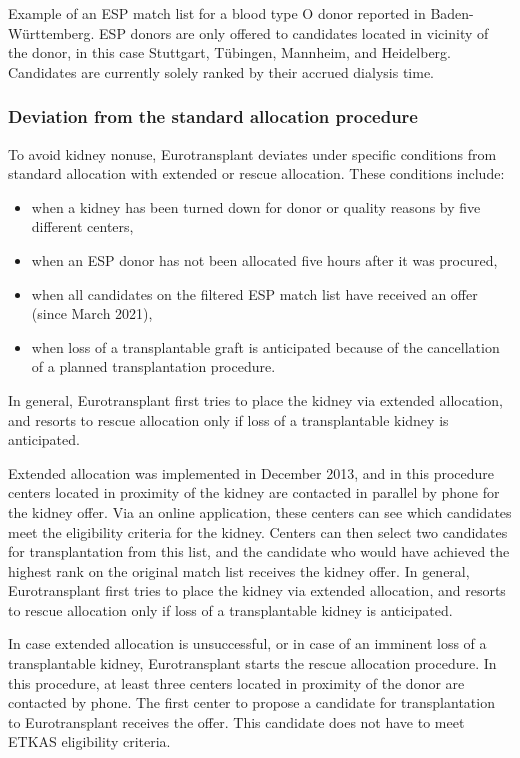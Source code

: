 \begin{table}[h]
	\resizebox{\linewidth}{!}{
		\centering
		
	}
	\caption{Example of an ESP match list for a blood type O donor reported in Baden-Württemberg. ESP donors are only offered to candidates located in vicinity of the donor, in this case Stuttgart, Tübingen, Mannheim, and Heidelberg. Candidates are currently solely ranked by their accrued dialysis time.
	}
	\label{tab:example_esp_match_list}
\end{table}

\FloatBarrier
\subsubsection{Deviation from the standard allocation procedure}
\label{subsection:rescue}
To avoid kidney nonuse, Eurotransplant deviates under specific conditions from standard allocation with extended or rescue allocation. These conditions include:
\begin{itemize}[noitemsep]
	\itemsep0em
	\item when a kidney has been turned down for donor or quality reasons by five different centers,
	\item when an ESP donor has not been allocated five hours after it was procured,
	\item when all candidates on the filtered ESP match list have received an offer (since March 2021),
	\item when loss of a transplantable graft is anticipated because of the cancellation of a planned transplantation procedure.
\end{itemize}
In general, Eurotransplant first tries to place the kidney via extended allocation, and resorts to rescue allocation only if loss of a transplantable kidney is anticipated.
\par 
Extended allocation was implemented in December 2013, and in this procedure centers located in proximity of the kidney are contacted in parallel by phone for the kidney offer. Via an online application, these centers can see which candidates meet the eligibility criteria for the kidney. Centers can then select two candidates for transplantation from this list, and the candidate who would have achieved the highest rank on the original match list receives the kidney offer. In general, Eurotransplant first tries to place the kidney via extended allocation, and resorts to rescue allocation only if loss of a transplantable kidney is anticipated.
\par
In case extended allocation is unsuccessful, or in case of an imminent loss of a transplantable kidney, Eurotransplant starts the rescue allocation procedure. In this procedure, at least three centers located in proximity of the donor are contacted by phone. The first center to propose a candidate for transplantation to Eurotransplant receives the offer. This candidate does not have to meet ETKAS eligibility criteria. 